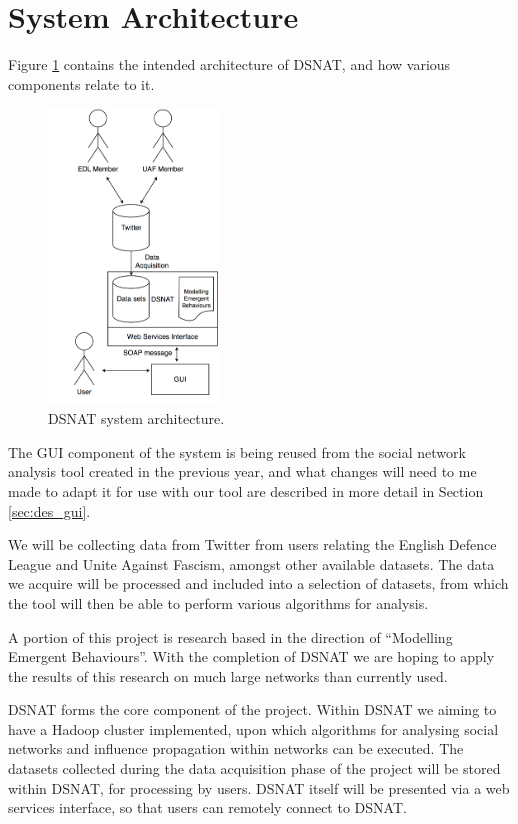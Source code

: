 \section{System Architecture}
Figure \ref{fig:system} contains the intended architecture of DSNAT, and how various components relate to it.

\begin{figure}[htbp]
  \centering
    \includegraphics[width=0.4\textwidth]{./img/system}
  \caption{DSNAT system architecture.}
  \label{fig:system}
\end{figure}

The GUI component of the system is being reused from the social network analysis tool \cite{snat} created in the previous year, and what changes will need to me made to adapt it for use with our tool are described in more detail in Section \ref{sec:des_gui}.

We will be collecting data from Twitter from users relating the English Defence League and Unite Against Fascism, amongst other available datasets. The data we acquire will be processed and included into a selection of datasets, from which the tool will then be able to perform various algorithms for analysis.

A portion of this project is research based in the direction of ``Modelling Emergent Behaviours''. With the completion of DSNAT we are hoping to apply the results of this research on much large networks than currently used.

DSNAT forms the core component of the project. Within DSNAT we aiming to have a Hadoop cluster implemented, upon which algorithms for analysing social networks and influence propagation within networks can be executed. The datasets collected during the data acquisition phase of the project will be stored within DSNAT, for processing by users. DSNAT itself will be presented via a web services interface, so that users can remotely connect to DSNAT.